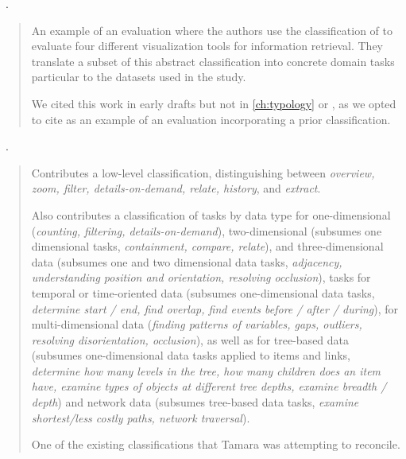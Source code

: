 \begin{sloppypar}
~\cite{Morse2000}. \end{sloppypar}

\begin{quotation}
    An example of an evaluation where the authors use the classification of \citet{Zhou1998} to evaluate four different visualization tools for information retrieval.
     They translate a subset of this abstract classification into concrete domain tasks particular to the datasets used in the study.

    We cited this work in early drafts but not in \autoref{ch:typology} or \citet{Brehmer2013}, as we opted to cite \citet{Perer2009} as an example of an evaluation incorporating a prior classification.
\end{quotation}

\begin{sloppypar}
~\cite{Shneiderman1996}. \end{sloppypar}

\begin{quotation}
    Contributes a low-level classification, distinguishing between {\it overview, zoom, filter, details-on-demand, relate, history}, and {\it extract}.
    
    \begin{sloppypar}
    Also contributes a classification of tasks by data type for one-dimensional ({\it counting, filtering, details-on-demand}),
    two-dimensional (subsumes one dimensional tasks, {\it containment, compare, relate}), and three-dimensional data (subsumes one and two dimensional data tasks, {\it adjacency, understanding position and orientation, resolving occlusion}), tasks for temporal or time-oriented data (subsumes one-dimensional data tasks, {\it determine start / end, find overlap, find events before / after / during}), for multi-dimensional data ({\it  finding patterns of variables, gaps, outliers, resolving disorientation, occlusion}), as well as for tree-based data (subsumes one-dimensional data tasks applied to items and links, {\it determine how many levels in the tree, how many children does an item have, examine types of objects at different tree depths, examine breadth / depth}) and network data (subsumes tree-based data tasks, {\it examine shortest/less costly paths, network traversal}).
    \end{sloppypar}
    
    One of the existing classifications that Tamara was attempting to reconcile.
\end{quotation}

